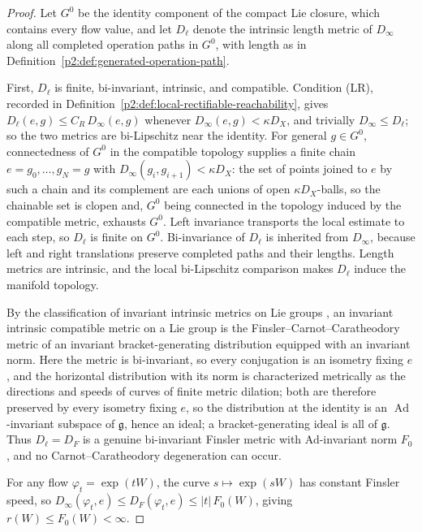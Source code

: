 \documentclass[11pt,a4paper]{article}
\begin{document}
\begin{proof}
Let \(G^0\) be the identity component of the compact Lie closure, which
contains every flow value, and let \(D_\ell\) denote the intrinsic length
metric of \(D_\infty\) along all completed operation paths in \(G^0\), with
length as in Definition~\ref{p2:def:generated-operation-path}.

First, \(D_\ell\) is finite, bi-invariant, intrinsic, and compatible.
Condition (LR), recorded in
Definition~\ref{p2:def:local-rectifiable-reachability}, gives
\(D_\ell(e,g)\le C_R\,D_\infty(e,g)\) whenever
\(D_\infty(e,g)<\kappa D_X\), and trivially
\(D_\infty\le D_\ell\); so the two metrics are bi-Lipschitz near the
identity.  For general \(g\in G^0\), connectedness of \(G^0\) in the
compatible topology supplies a finite chain \(e=g_0,\dots,g_N=g\) with
\(D_\infty(g_i,g_{i+1})<\kappa D_X\): the set of points joined to
\(e\) by such a chain and its complement are each unions of open
\(\kappa D_X\)-balls, so the chainable set is clopen and, \(G^0\) being
connected in the topology induced by the compatible metric, exhausts
\(G^0\).  Left invariance transports the local estimate to each step, so
\(D_\ell\) is finite on \(G^0\).
Bi-invariance of \(D_\ell\) is inherited from \(D_\infty\), because left
and right translations preserve completed paths and their lengths.
Length metrics are intrinsic, and the local bi-Lipschitz comparison makes
\(D_\ell\) induce the manifold topology.

By the classification of invariant intrinsic metrics on Lie groups
\cite{Berestovskii1988,agrachev2019comprehensive}, an invariant intrinsic
compatible metric on a Lie group is the Finsler--Carnot--Caratheodory
metric of an invariant bracket-generating distribution equipped with an
invariant norm.  Here the metric is bi-invariant, so every conjugation is an isometry
fixing \(e\), and the horizontal distribution with its norm is
characterized metrically as the directions and speeds of curves of
finite metric dilation; both are therefore preserved by every isometry
fixing \(e\), so the distribution at the identity is an
\(\operatorname{Ad}\)-invariant subspace of \(\mathfrak g\), hence an
ideal; a bracket-generating ideal is all of
\(\mathfrak g\).  Thus \(D_\ell=D_F\) is a genuine bi-invariant Finsler
metric with Ad-invariant norm \(F_0\), and no Carnot--Caratheodory
degeneration can occur.

For any flow \(\varphi_t=\exp(tW)\), the curve
\(s\mapsto\exp(sW)\) has constant Finsler speed, so
\(D_\infty(\varphi_t,e)\le D_F(\varphi_t,e)\le|t|\,F_0(W)\), giving
\(r(W)\le F_0(W)<\infty\).


\end{proof}
\end{document}

